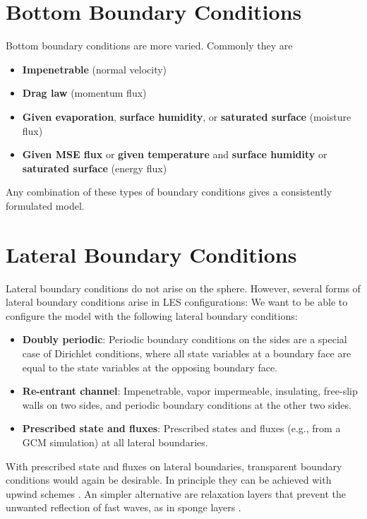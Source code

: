 \documentclass{report}
\begin{document}
\section{Bottom Boundary Conditions} \label{s:bottom_bc}

Bottom boundary conditions are more varied. Commonly they are
\begin{itemize}
    \item \textbf{Impenetrable} (normal velocity)
    \item \textbf{Drag law} (momentum flux)
    \item \textbf{Given evaporation}, \textbf{surface humidity}, or \textbf{saturated surface} (moisture flux)
    \item \textbf{Given MSE flux} or \textbf{given temperature} and \textbf{surface humidity} or \textbf{saturated surface} (energy flux)
\end{itemize}
Any combination of these types of boundary conditions gives a consistently formulated model.

\section{Lateral Boundary Conditions}

Lateral boundary conditions do not arise on the sphere. However, several forms of lateral boundary conditions arise in LES configurations: We want to be able to configure the model with the following lateral boundary conditions:
\begin{itemize}
    \item \textbf{Doubly periodic}: Periodic boundary conditions on the sides are a special case of Dirichlet conditions, where all state variables at a boundary face are equal to the state variables at the opposing boundary face.
    \item \textbf{Re-entrant channel}: Impenetrable, vapor impermeable, insulating, free-slip walls on two sides, and periodic boundary conditions at the other two sides. 
    \item \textbf{Prescribed state and fluxes}: Prescribed states and fluxes (e.g., from a GCM simulation) at all lateral boundaries. 
\end{itemize}
With prescribed state and fluxes on lateral boundaries, transparent boundary conditions would again be desirable. In principle they can be achieved with upwind schemes \citep{Davies14a}. An simpler alternative are relaxation layers that prevent the unwanted reflection of fast waves, as in sponge layers \citep{Davies76a}.
\end{document}
